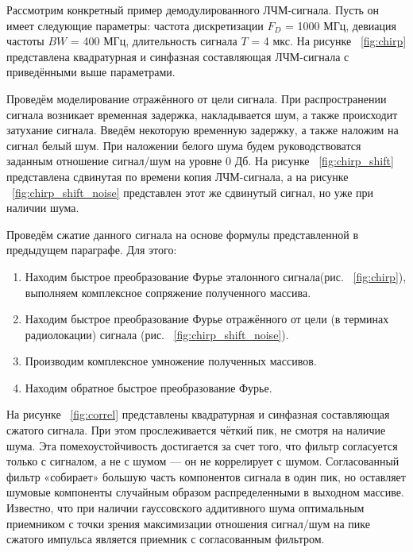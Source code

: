 Рассмотрим конкретный пример демодулированного ЛЧМ-сигнала. Пусть он имеет следующие параметры: частота дискретизации \(F_{D}\) = 1000 МГц, девиация частоты \(BW\) = 400 МГц, длительность сигнала \(T\) = 4 мкс. На рисунке ~\ref{fig:chirp} представлена квадратурная и синфазная составляющая ЛЧМ-сигнала с приведёнными выше параметрами. 

Проведём моделирование отражённого от цели сигнала. При распространении сигнала возникает временная задержка, накладывается шум, а также происходит затухание сигнала. Введём некоторую временную задержку, а также наложим на сигнал белый шум. При наложении белого шума будем руководствоватся заданным отношение сигнал/шум на уровне 0 Дб. На рисунке ~\ref{fig:chirp_shift} представлена сдвинутая по времени копия ЛЧМ-сигнала, а на рисунке ~\ref{fig:chirp_shift_noise} представлен этот же сдвинутый сигнал, но уже при наличии шума.  

Проведём сжатие данного сигнала на основе формулы представленной в предыдущем параграфе. Для этого:

\begin{enumerate}
	\item Находим быстрое преобразование Фурье эталонного сигнала(рис. ~\ref{fig:chirp}), выполняем комплексное сопряжение полученного массива.
	\item Находим быстрое преобразование Фурье отражённого от цели (в терминах радиолокации) сигнала (рис. ~\ref{fig:chirp_shift_noise}).
	\item Производим комплексное умножение полученных массивов.
	\item Находим обратное быстрое преобразование Фурье.
\end{enumerate}

На рисунке ~\ref{fig:correl} представлены квадратурная и синфазная составляющая сжатого сигнала. При этом прослеживается чёткий пик, не смотря на наличие шума. Эта помехоустойчивость достигается за счет того, что фильтр согласуется только с сигналом, а не с шумом — он не коррелирует с шумом. Согласованный фильтр «собирает» большую часть компонентов сигнала в один пик, но оставляет шумовые компоненты случайным образом распределенными в выходном массиве. Известно, что при наличии гауссовского аддитивного шума оптимальным приемником с точки зрения максимизации отношения сигнал/шум на пике сжатого импульса является приемник с согласованным фильтром.

